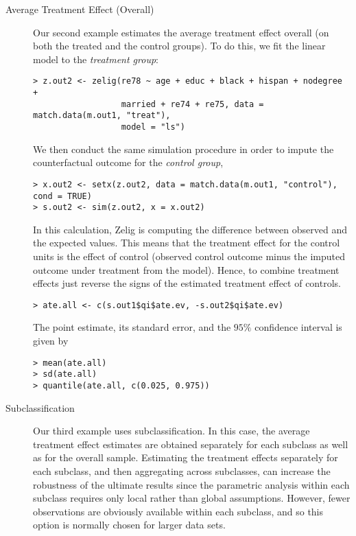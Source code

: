 \begin{description}
\item[Average Treatment Effect (Overall)] Our second example estimates
  the average treatment effect overall (on both the treated and the
  control groups).  To do this, we fit the linear model to the {\it
    treatment group}:
\begin{verbatim}
> z.out2 <- zelig(re78 ~ age + educ + black + hispan + nodegree + 
                  married + re74 + re75, data = match.data(m.out1, "treat"), 
                  model = "ls")
\end{verbatim}
We then conduct the same simulation procedure in order to impute the
counterfactual outcome for the {\it control group},
\begin{verbatim}
> x.out2 <- setx(z.out2, data = match.data(m.out1, "control"), cond = TRUE)
> s.out2 <- sim(z.out2, x = x.out2)
\end{verbatim}
In this calculation, Zelig is computing the difference between
observed and the expected values.  This means that the treatment
effect for the control units is the effect of control (observed
control outcome minus the imputed outcome under treatment from the
model).  Hence, to combine treatment effects just reverse the signs of
the estimated treatment effect of controls.
\begin{verbatim}
> ate.all <- c(s.out1$qi$ate.ev, -s.out2$qi$ate.ev)
\end{verbatim}
The point estimate, its standard error, and the $95\%$ confidence
interval is given by
\begin{verbatim}
> mean(ate.all)
> sd(ate.all)
> quantile(ate.all, c(0.025, 0.975))
\end{verbatim}
  
\item[Subclassification] Our third example uses subclassification. In
  this case, the average treatment effect estimates are obtained
  separately for each subclass as well as for the overall sample.
  Estimating the treatment effects separately for each subclass, and
  then aggregating across subclasses, can increase the robustness of
  the ultimate results since the parametric analysis within each
  subclass requires only local rather than global assumptions.
  However, fewer observations are obviously available within each
  subclass, and so this option is normally chosen for larger data
  sets.


\end{description}
